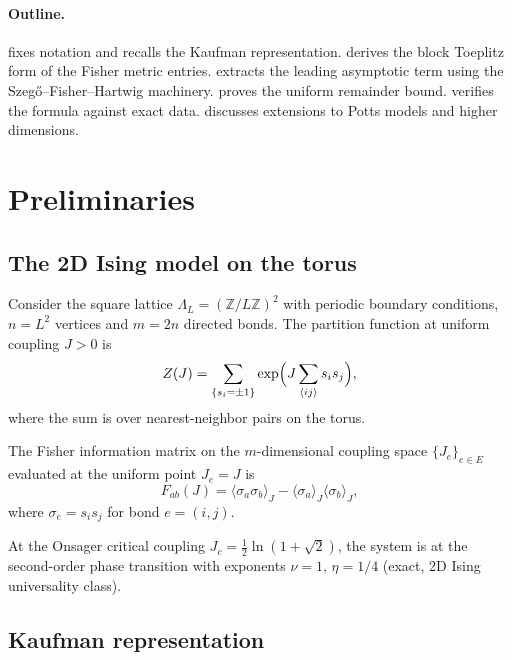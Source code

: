 \documentclass[11pt]{article}
\theoremstyle{definition}
\theoremstyle{remark}
\newcommand{\Fish}{F}
\newcommand{\Jc}{J_c}
\newcommand{\Z}{\mathbb{Z}}
\begin{document}
\paragraph{Outline.}
 fixes notation and recalls the Kaufman representation.
 derives the block Toeplitz form of the Fisher
metric entries.
 extracts the leading asymptotic term using the
Szeg\H{o}--Fisher--Hartwig machinery.
 proves the uniform remainder bound.
 verifies the formula against exact data.
 discusses extensions to Potts models and higher
dimensions.


\section{Preliminaries}
\label{sec:prelim}

\subsection{The 2D Ising model on the torus}

Consider the square lattice $\Lambda_L = (\Z/L\Z)^2$ with periodic
boundary conditions, $n = L^2$ vertices and $m = 2n$ directed bonds.
The partition function at uniform coupling $J > 0$ is
\begin{equation}
  Z(J) = \sum_{\{s_i = \pm 1\}} \exp\Bigl(J \sum_{\langle ij \rangle}
    s_i s_j\Bigr),
  \label{eq:partition}
\end{equation}
where the sum is over nearest-neighbor pairs on the torus.

The Fisher information matrix on the $m$-dimensional coupling space
$\{J_e\}_{e \in E}$ evaluated at the uniform point $J_e = J$ is
\begin{equation}
  \Fish_{ab}(J) = \langle \sigma_a \sigma_b \rangle_J
    - \langle \sigma_a \rangle_J \langle \sigma_b \rangle_J,
  \label{eq:fisher}
\end{equation}
where $\sigma_e = s_i s_j$ for bond $e = (i,j)$.

At the Onsager critical coupling $\Jc = \frac{1}{2}\ln(1 + \sqrt{2})$,
the system is at the second-order phase transition with exponents
$\nu = 1$, $\eta = 1/4$ (exact, 2D Ising universality class).

\subsection{Kaufman representation}
\label{subsec:kaufman}
\end{document}
